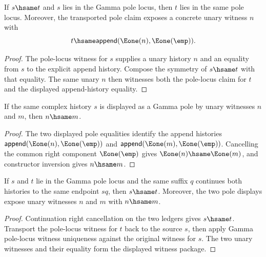 \begin{theorem}
\label{thm:gamma-pole-locus-hsame-transport-witness}
If $s\hsame t$ and $s$ lies in the Gamma pole locus, then $t$ lies in the
same pole locus. Moreover, the transported pole claim exposes a concrete unary
witness $n$ with
$$
t\hsame \mathsf{append}(\Eone(n),\Eone(\emp)).
$$
\end{theorem}
\begin{proof}
The pole-locus witness for $s$ supplies a unary history $n$ and an equality
from $s$ to the explicit append history. Compose the symmetry of $s\hsame t$
with that equality. The same unary $n$ then witnesses both the pole-locus
claim for $t$ and the displayed append-history equality.
\end{proof}

\begin{theorem}
\label{thm:gamma-pole-locus-witness-unique}
If the same complex history \(s\) is displayed as a Gamma pole by unary
witnesses \(n\) and \(m\), then \(n\hsame m\).
\end{theorem}
\begin{proof}
The two displayed pole equalities identify the append histories
\(\mathsf{append}(\Eone(n),\Eone(\emp))\) and
\(\mathsf{append}(\Eone(m),\Eone(\emp))\). Cancelling the common right
component \(\Eone(\emp)\) gives \(\Eone(n)\hsame\Eone(m)\), and constructor
inversion gives \(n\hsame m\).
\end{proof}

\begin{theorem}
\label{thm:gamma-pole-locus-suffix-source-witness-deterministic}
If $s$ and $t$ lie in the Gamma pole locus and the same suffix $q$ continues
both histories to the same endpoint $sq$, then $s\hsame t$. Moreover, the two
pole displays expose unary witnesses $n$ and $m$ with $n\hsame m$.
\end{theorem}
\begin{proof}
Continuation right cancellation on the two ledgers gives $s\hsame t$. Transport
the pole-locus witness for $t$ back to the source $s$, then apply Gamma
pole-locus witness uniqueness against the original witness for $s$. The two
unary witnesses and their equality form the displayed witness package.
\end{proof}


